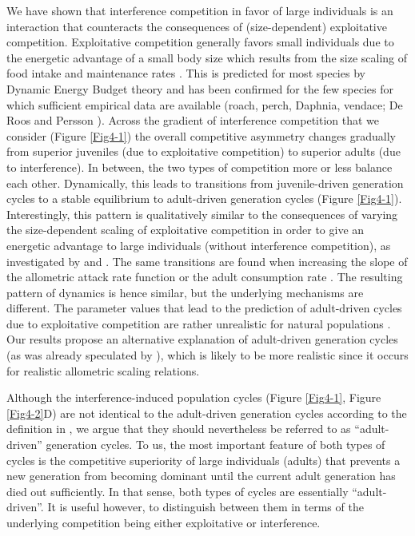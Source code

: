We have shown that interference competition in favor of large individuals is an
interaction that counteracts the consequences of (size-dependent) exploitative
competition. Exploitative competition generally favors small individuals due to
the energetic advantage of a small body size which results from the size scaling
of food intake and maintenance rates
\autocite{peters1986a,persson1998a,de-roos2013a}. This is predicted for most
species by Dynamic Energy Budget theory \autocite{kooijman2000a} and has been
confirmed for the few species for which sufficient empirical data are available
(roach, perch, Daphnia, vendace; De Roos and Persson \citeyear{de-roos2013a}).
Across the gradient of interference competition that we consider (Figure
\ref{Fig4-1}) the overall competitive asymmetry changes gradually from superior
juveniles (due to exploitative competition) to superior adults (due to
interference). In between, the two types of competition more or less balance
each other. Dynamically, this leads to transitions from juvenile-driven
generation cycles to a stable equilibrium to adult-driven generation cycles
(Figure \ref{Fig4-1}).
Interestingly, this pattern is qualitatively similar to the consequences of
varying the size-dependent scaling of exploitative competition in order to give
an energetic advantage to large individuals (without interference competition),
as investigated by \textcite{persson1998a} and \textcite{de-roos2003a}.
The same transitions are found when increasing the slope of the allometric
attack rate function \autocite{persson1998a} or the adult consumption rate
\autocite{de-roos2003a}. The resulting pattern of dynamics is hence similar, but
the underlying mechanisms are different. The parameter values that lead to the
prediction of adult-driven cycles due to exploitative competition are rather
unrealistic for natural populations \autocite{persson1998a,de-roos2003a}. Our
results propose an alternative explanation of adult-driven generation cycles (as
was already speculated by \textcite{de-roos2003a}), which is likely to be more
realistic since it occurs for realistic allometric scaling relations.

Although the interference-induced population cycles (Figure \ref{Fig4-1}, Figure
\ref{Fig4-2}D) are not identical to the adult-driven generation cycles according
to the definition in \textcite{de-roos2003a}, we argue that they should
nevertheless be referred to as “adult-driven” generation cycles. To us, the most
important feature of both types of cycles is the competitive superiority of
large individuals (adults) that prevents a new generation from becoming dominant
until the current adult generation has died out sufficiently. In that sense,
both types of cycles are essentially “adult-driven”. It is useful however, to
distinguish between them in terms of the underlying competition being either
exploitative or interference.

